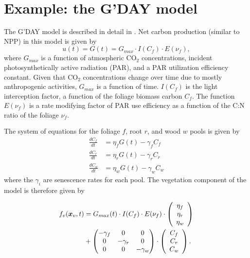 \documentclass[11pt,a4paper]{article}
\begin{document}
\section{Example: the G'DAY model}
The G'DAY model is described in detail in \citet{Comins1993EA}. Net carbon production (similar to NPP) in this model is given by
\begin{equation}
u(t) = G(t) = G_{max} \cdot I(C_f) \cdot E(\nu_f),
\end{equation}
where $G_{max}$ is a function of atmospheric CO$_2$ concentrations, incident photosynthetically active radiation (PAR), and a PAR utilization efficiency constant. Given that CO$_2$ concentrations change over time due to mostly anthropogenic activities, $G_{max}$ is a function of time. $I(C_f)$ is the light interception factor, a function of the foliage biomass carbon $C_f$. The function $E(\nu_f)$ is a rate modifying factor of PAR use efficiency as a function of the C:N ratio of the foliage $\nu_f$.

The system of equations for the foliage $f$, root $r$, and wood $w$ pools is given by
\begin{align}
\frac{dC_f}{dt} &= \eta_f G(t) - \gamma_f C_f \\
\frac{dC_r}{dt} &= \eta_r G(t) - \gamma_r C_r \\
\frac{dC_w}{dt} &= \eta_w G(t) - \gamma_w C_w
\end{align}
where the $\gamma_i$ are senescence rates for each pool. The vegetation component of the model is therefore given by

\begin{align}
f_v({\bm x_v}, t) &= G_{max}(t) \cdot I(C_f) \cdot E(\nu_f) \cdot \left( \begin{array}{c} \eta_f \\ \eta_r \\ \eta_w \end{array}\right) \notag \\
&+  \left(   \begin{matrix} 
      -\gamma_f & 0 & 0 \\
      0 &  -\gamma_r & 0 \\
      0 & 0 & -\gamma_w
   \end{matrix}
  \right) \cdot \left( \begin{array}{c} C_f \\ C_r \\ C_w \end{array}\right).
\end{align}
\end{document}
